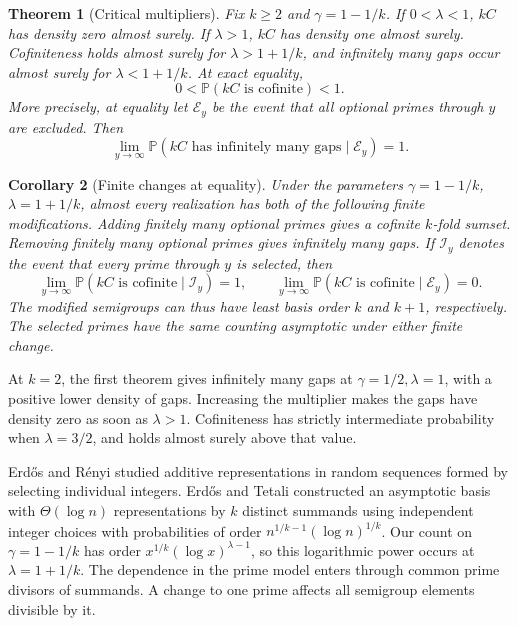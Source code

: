 \documentclass[11pt]{article}
\newtheorem{theorem}{Theorem}
\newtheorem{corollary}[theorem]{Corollary}
\newcommand{\PP}{\mathbb P}
\begin{document}
\begin{theorem}[Critical multipliers]\label{thm:multiplier}
Fix \(k\ge2\) and \(\gamma=1-1/k\). If \(0<\lambda<1\), \(kC\)
has density zero almost surely. If \(\lambda>1\), \(kC\) has
density one almost surely. Cofiniteness holds almost surely for
\(\lambda>1+1/k\), and infinitely many gaps occur almost surely for
\(\lambda<1+1/k\). At exact equality,
\[
        0<\PP(kC\text{ is cofinite})<1.
\]
More precisely, at equality let \(\mathcal E_y\) be the event that
all optional primes through \(y\) are excluded. Then
\[
          \lim_{y\to\infty}\PP(kC\text{ has infinitely many gaps}
                                        \mid\mathcal E_y)=1 .
\]
\end{theorem}

\begin{corollary}[Finite changes at equality]\label{cor:changes}
Under the parameters \(\gamma=1-1/k\), \(\lambda=1+1/k\), almost
every realization has both of the following finite modifications.
Adding finitely many optional primes gives a cofinite \(k\)-fold
sumset. Removing finitely many optional primes gives infinitely
many gaps. If \(\mathcal I_y\) denotes the event that every prime
through \(y\) is selected, then
\[
  \lim_{y\to\infty}\PP(kC\text{ is cofinite}\mid\mathcal I_y)=1,
  \qquad
  \lim_{y\to\infty}\PP(kC\text{ is cofinite}\mid\mathcal E_y)=0 .
\]
The modified semigroups can thus have least basis order \(k\) and
\(k+1\), respectively. The selected primes have the same counting
asymptotic under either finite change.
\end{corollary}

At \(k=2\), the first theorem gives infinitely many gaps at
\(\gamma=1/2,\lambda=1\), with a positive lower density of gaps.
Increasing the multiplier makes the gaps have density zero as
soon as \(\lambda>1\). Cofiniteness has strictly intermediate
probability when \(\lambda=3/2\), and holds almost surely above
that value.

Erd\H{o}s and R\'enyi \cite{ER} studied additive representations
in random sequences formed by selecting individual integers.
Erd\H{o}s and Tetali \cite{ET} constructed an asymptotic basis
with \(\Theta(\log n)\) representations by \(k\) distinct
summands using independent integer choices with probabilities of
order \(n^{1/k-1}(\log n)^{1/k}\). Our count on \(\gamma=1-1/k\)
has order \(x^{1/k}(\log x)^{\lambda-1}\), so this logarithmic
power occurs at \(\lambda=1+1/k\). The dependence in the prime
model enters through common prime divisors of summands. A change
to one prime affects all semigroup elements divisible by it.
\end{document}
